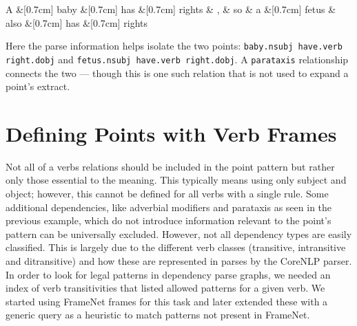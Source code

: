     \vspace{3mm}
	\begin{dependency}[edge horizontal padding=0]
		\begin{deptext}
			A \&[0.7cm] baby \&[0.7cm] has \&[0.7cm] rights \& , \& so \& a \&[0.7cm] fetus \& also \&[0.7cm] has \&[0.7cm] rights \\
		\end{deptext}


	\end{dependency}
    \vspace{-2mm}

    Here the parse information helps isolate the two points: \texttt{baby.nsubj have.verb right.dobj} and \texttt{fetus.nsubj have.verb right.dobj}. A \texttt{parataxis} relationship connects the two --- though this is one such relation that is not used to expand a point's extract.

  \section{Defining Points with Verb Frames}
    Not all of a verbs relations should be included in the point pattern but rather only those essential to the meaning. This typically means using only subject and object; however, this cannot be defined for all verbs with a single rule. Some additional dependencies, like adverbial modifiers and parataxis as seen in the previous example, which do not introduce information relevant to the point's pattern can be universally excluded. However, not all dependency types are easily classified. This is largely due to the different verb classes (transitive, intransitive and ditransitive) and how these are represented in parses by the CoreNLP parser. In order to look for legal patterns in dependency parse graphs, we needed an index of verb transitivities that listed allowed patterns for a given verb. We started using FrameNet frames for this task and later extended these with a generic query as a heuristic to match patterns not present in FrameNet.

